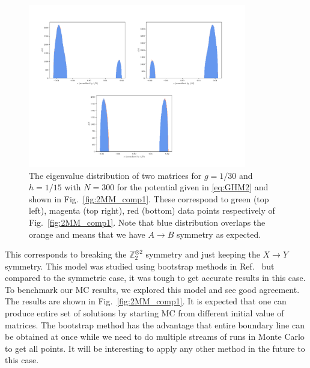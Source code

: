\documentclass[11pt]{article}
\begin{document}
\begin{figure}[htbp] 
	\centering 
	\includegraphics[width=0.85\textwidth]{figs/all_symb_ev.pdf}
	\caption{\label{fig:2MM_evd}The eigenvalue distribution of two matrices for $g=1/30$ and $h=1/15$ 
	with $N=300$ for the potential given in \ref{eq:GHM2} and shown in Fig.~\ref{fig:2MM_comp1}.
	These correspond to green (top left), magenta (top right), red (bottom) data points respectively of Fig.~\ref{fig:2MM_comp1}.
	Note that blue distribution overlaps the orange and means that we have $A \to B$ symmetry as expected.}
\end{figure}
This corresponds to breaking the $\mathbb{Z}_{2}^{\otimes 2}$ symmetry and just keeping the $X \to Y$ symmetry. This model was studied using bootstrap methods in 
Ref.~\cite{Kazakov:2021lel} but compared to the symmetric case, it was tough to get accurate results in this case. 
To benchmark our MC results, we explored this model
and see good agreement. The results are shown in Fig.~\ref{fig:2MM_comp1}. It is expected that one can produce entire set of solutions by starting MC from different initial value of matrices. The bootstrap method has the advantage that entire boundary line can be obtained at once while we need to do multiple streams of runs in Monte Carlo to get all points. It will be interesting to apply any other method in the future to this case.   
\end{document}
